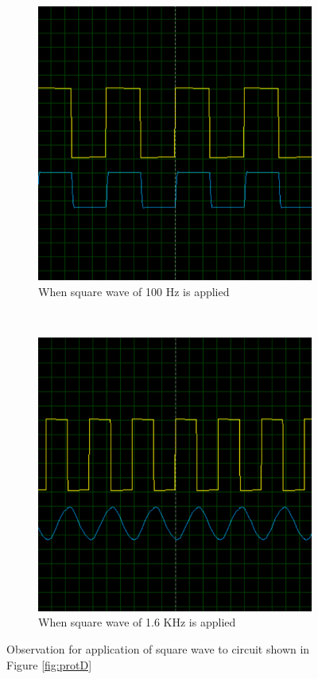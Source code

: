 \documentclass{lab_sheet}
\begin{document}
\begin{figure}[H]
   \centering
   \begin{subfigure}{0.49\textwidth}
      \centering
   \includegraphics[width=0.9\linewidth]{../Figures/osc_d_1.png}
   \caption{When square wave of 100 Hz is applied}
   \end{subfigure}~
   \begin{subfigure}{0.49\textwidth}
      \centering
      \includegraphics[width=0.9\linewidth]{../Figures/osc_d_2.png}
      \caption{When square wave of 1.6 KHz is applied}
      \end{subfigure}
      \caption{Observation for application of square wave to circuit shown in Figure \ref{fig:protD}}
   \label{fig:osc_d}
\end{figure}
\end{document}
